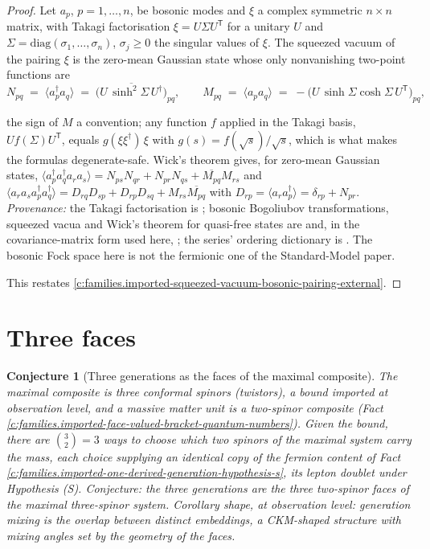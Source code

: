 \documentclass[11pt]{article}
\newtheorem{conjecture}[theorem]{Conjecture}
\theoremstyle{definition}
\theoremstyle{plain}
\newcommand{\changedmark}[2]{\marginpar{\raggedright\scriptsize\color{#1}#2}}
\begin{document}
\begin{proof}
Let $a_{p}$, $p = 1, \dots, n$, be bosonic modes and $\xi$ a complex symmetric $n \times n$ matrix, with Takagi factorisation $\xi = U\Sigma U^{\mathsf{T}}$ for a unitary $U$ and $\Sigma = \mathrm{diag}(\sigma_{1}, \dots, \sigma_{n})$, $\sigma_{j} \ge 0$ the singular values of $\xi$. The squeezed vacuum of the pairing $\xi$ is the zero-mean Gaussian state whose only nonvanishing two-point functions are
\[
N_{pq} \;=\; \langle a_{p}^{\dagger}a_{q}\rangle \;=\; \overline{\bigl(U\,\sinh^{2}\!\Sigma\,U^{\dagger}\bigr)}_{pq}, \qquad
M_{pq} \;=\; \langle a_{p}a_{q}\rangle \;=\; -\bigl(U\,\sinh\Sigma\cosh\Sigma\,U^{\mathsf{T}}\bigr)_{pq},
\]

the sign of $M$ a convention; any function $f$ applied in the Takagi basis, $U f(\Sigma) U^{\mathsf{T}}$, equals $g(\xi\xi^{\dagger})\,\xi$ with $g(s) = f(\sqrt{s})/\sqrt{s}$, which is what makes the formulas degenerate-safe. Wick's theorem gives, for zero-mean Gaussian states, $\langle a_{p}^{\dagger}a_{q}^{\dagger}a_{r}a_{s}\rangle = N_{ps}N_{qr} + N_{pr}N_{qs} + \overline{M_{pq}}M_{rs}$ and $\langle a_{r}a_{s}a_{p}^{\dagger}a_{q}^{\dagger}\rangle = D_{rq}D_{sp} + D_{rp}D_{sq} + M_{rs}\overline{M_{pq}}$ with $D_{rp} = \langle a_{r}a_{p}^{\dagger}\rangle = \delta_{rp} + N_{pr}$. \emph{Provenance:} the Takagi factorisation is \cite[Cor.~4.4.4]{HornJohnson}; bosonic Bogoliubov transformations, squeezed vacua and Wick's theorem for quasi-free states are \cite[Ch.~2-3]{Berezin1966} and, in the covariance-matrix form used here, \cite[\S II]{Weedbrook2012}; the series' ordering dictionary is \cite[Thm.~5.7]{ButlerT9}. The bosonic Fock space here is not the fermionic one of the Standard-Model paper.

This restates \ref{c:families.imported-squeezed-vacuum-bosonic-pairing-external}.

\end{proof}

\section{Three faces}

\begin{conjecture}[Three generations as the faces of the maximal composite]\label{c:families.three-generations-faces-maximal-composite}
\changedmark{gray}{reworded}
The maximal composite is three conformal spinors (twistors), a bound imported at observation level, and a massive matter unit is a two-spinor composite (Fact \ref{c:families.imported-face-valued-bracket-quantum-numbers}). Given the bound, there are $\binom{3}{2} = 3$ ways to choose which two spinors of the maximal system carry the mass, each choice supplying an identical copy of the fermion content of Fact \ref{c:families.imported-one-derived-generation-hypothesis-s}, its lepton doublet under Hypothesis (S). Conjecture: the three generations are the three two-spinor faces of the maximal three-spinor system. Corollary shape, at observation level: generation mixing is the overlap between distinct embeddings, a CKM-shaped structure with mixing angles set by the geometry of the faces.
\end{conjecture}
\end{document}
